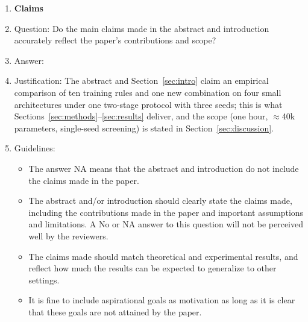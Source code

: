 \documentclass{article}
\begin{document}
\begin{enumerate}

\item {\bf Claims}
    \item[] Question: Do the main claims made in the abstract and introduction accurately reflect the paper's contributions and scope?
    \item[] Answer: \answerYes{}
    \item[] Justification: The abstract and Section~\ref{sec:intro} claim an empirical comparison of ten training rules and one new combination on four small architectures under one two-stage protocol with three seeds; this is what Sections~\ref{sec:methods}--\ref{sec:results} deliver, and the scope (one hour, $\approx$40k parameters, single-seed screening) is stated in Section~\ref{sec:discussion}.
    \item[] Guidelines:
    \begin{itemize}
        \item The answer NA means that the abstract and introduction do not include the claims made in the paper.
        \item The abstract and/or introduction should clearly state the claims made, including the contributions made in the paper and important assumptions and limitations. A No or NA answer to this question will not be perceived well by the reviewers.
        \item The claims made should match theoretical and experimental results, and reflect how much the results can be expected to generalize to other settings.
        \item It is fine to include aspirational goals as motivation as long as it is clear that these goals are not attained by the paper.
    \end{itemize}


\end{enumerate}
\end{document}

